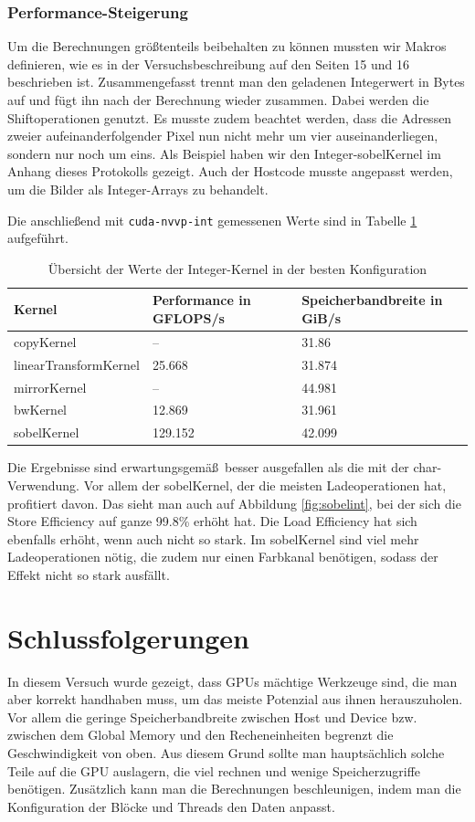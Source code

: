 \documentclass[12pt,a4paper]{scrartcl}
\begin{document}
\subsubsection{Performance-Steigerung}
Um die Berechnungen gr\"o\ss tenteils beibehalten zu k\"onnen mussten wir Makros definieren, wie es in der Versuchsbeschreibung auf den Seiten 15 und 16 beschrieben ist.
Zusammengefasst trennt man den geladenen Integerwert in Bytes auf und f\"ugt ihn nach der Berechnung wieder zusammen.
Dabei werden die Shiftoperationen genutzt.
Es musste zudem beachtet werden, dass die Adressen zweier aufeinanderfolgender Pixel nun nicht mehr um vier auseinanderliegen, sondern nur noch um eins.
Als Beispiel haben wir den Integer-sobelKernel im Anhang dieses Protokolls gezeigt.
Auch der Hostcode musste angepasst werden, um die Bilder als Integer-Arrays zu behandelt.

Die anschlie\ss end mit \texttt{cuda-nvvp-int} gemessenen Werte sind in Tabelle \ref{perf-int} aufgef\"uhrt.

\begin{table}[h]
    \centering
    \begin{tabular}{l|l|l}
    \hline
    Kernel & Performance in GFLOPS/s & Speicherbandbreite in GiB/s \\
    \hline
    copyKernel & --                  & 31.86  \\
    linearTransformKernel & 25.668   & 31.874 \\
    mirrorKernel & --                & 44.981 \\
    bwKernel & 12.869                & 31.961 \\
    sobelKernel & 129.152            & 42.099 \\
    \hline
    \end{tabular}
    \caption{\"Ubersicht der Werte der Integer-Kernel in der besten Konfiguration}
    \label{perf-int}
\end{table}

Die Ergebnisse sind erwartungsgem\"a\ss\ besser ausgefallen als die mit der char-Verwendung.
Vor allem der sobelKernel, der die meisten Ladeoperationen hat, profitiert davon.
Das sieht man auch auf Abbildung \ref{fig:sobelint}, bei der sich die Store Efficiency auf ganze 99.8\% erh\"oht hat.
Die Load Efficiency hat sich ebenfalls erh\"oht, wenn auch nicht so stark.
Im sobelKernel sind viel mehr Ladeoperationen n\"otig, die zudem nur einen Farbkanal ben\"otigen, sodass der Effekt nicht so stark ausf\"allt.


\section{Schlussfolgerungen}
In diesem Versuch wurde gezeigt, dass GPUs m\"achtige Werkzeuge sind, die man aber korrekt handhaben muss, um das meiste Potenzial aus ihnen herauszuholen.
Vor allem die geringe Speicherbandbreite zwischen Host und Device bzw. zwischen dem Global Memory und den Recheneinheiten begrenzt die Geschwindigkeit von oben.
Aus diesem Grund sollte man haupts\"achlich solche Teile auf die GPU auslagern, die viel rechnen und wenige Speicherzugriffe ben\"otigen.
Zus\"atzlich kann man die Berechnungen beschleunigen, indem man die Konfiguration der Bl\"ocke und Threads den Daten anpasst.
\end{document}
